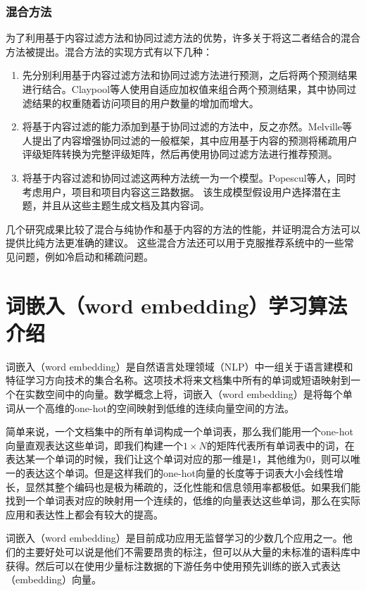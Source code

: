 \subsubsection{混合方法}
为了利用基于内容过滤方法和协同过滤方法的优势，许多关于将这二者结合的混合方法被提出。混合方法的实现方式有以下几种：
\begin{enumerate}[ 1.]
\item 先分别利用基于内容过滤方法和协同过滤方法进行预测，之后将两个预测结果进行结合\cite{rec12}。Claypool等人\cite{rec13}使用自适应加权值来组合两个预测结果，其中协同过滤结果的权重随着访问项目的用户数量的增加而增大。
\item 将基于内容过滤的能力添加到基于协同过滤的方法中，反之亦然。Melville等人\cite{rec14}提出了内容增强协同过滤的一般框架，其中应用基于内容的预测将稀疏用户评级矩阵转换为完整评级矩阵，然后再使用协同过滤方法进行推荐预测。
\item 将基于内容过滤和协同过滤这两种方法统一为一个模型。Popescul等人\cite{rec15}，同时考虑用户，项目和项目内容这三路数据。 该生成模型假设用户选择潜在主题，并且从这些主题生成文档及其内容词。
\end{enumerate}
几个研究成果比较了混合与纯协作和基于内容的方法的性能，并证明混合方法可以提供比纯方法更准确的建议。 这些混合方法还可以用于克服推荐系统中的一些常见问题，例如冷启动和稀疏问题。
\section{词嵌入（word embedding）学习算法介绍}
词嵌入（word embedding）是自然语言处理领域（NLP）中一组关于语言建模和特征学习方向技术的集合名称。这项技术将来文档集中所有的单词或短语映射到一个在实数空间中的向量。数学概念上将，词嵌入（word embedding）是将每个单词从一个高维的one-hot的空间映射到低维的连续向量空间的方法。

简单来说，一个文档集中的所有单词构成一个单词表，那么我们能用一个one-hot向量直观表达这些单词，即我们构建一个$1 \times N$的矩阵代表所有单词表中的词，在表达某一个单词的时候，我们让这个单词对应的那一维是1，其他维为0，则可以唯一的表达这个单词。但是这样我们的one-hot向量的长度等于词表大小会线性增长，显然其整个编码也是极为稀疏的，泛化性能和信息领用率都极低。如果我们能找到一个单词表对应的映射用一个连续的，低维的向量表达这些单词，那么在实际应用和表达性上都会有较大的提高。

词嵌入（word embedding）是目前成功应用无监督学习的少数几个应用之一。他们的主要好处可以说是他们不需要昂贵的标注，但可以从大量的未标准的语料库中获得。然后可以在使用少量标注数据的下游任务中使用预先训练的嵌入式表达（embedding）向量。

